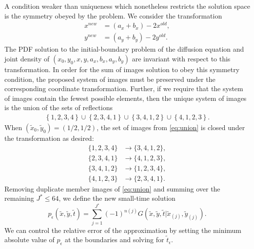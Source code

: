 A condition weaker than uniqueness which nonetheless restricts the
solution space is the symmetry obeyed by the problem. We consider the transformation
\begin{align*}
  x^{new} &= (a_x + b_x) - 2x^{old}, \\
  y^{new} &= (a_y + b_y) - 2y^{old}.            
\end{align*}
The PDF solution to the initial-boundary problem of the diffusion
equation and joint density of $(x_0,y_0,x,y,a_x,b_x,a_y,b_y)$ are
invariant with respect to this transformation. In order for the sum of
images solution to obey this symmetry condition, the proposed system
of images must be preserved under the corresponding coordinate
transformation. Further, if we require that the system of images
contain the fewest possible elements, then the unique system of images
is the union of the sets of reflections
\begin{align}
  \left\{ 1,2,3,4 \right\} \cup \left\{ 2,3,4,1 \right\} \cup \left\{ 3,4,1,2 \right\} \cup \left\{ 4,1,2,3 \right\}. \label{eq:union}
\end{align}
When $(\tilde{x}_0, \tilde{y}_0) = (1/2,1/2)$, the set of
images from \eqref{eq:union} is closed under the transformation as
desired:
\begin{align*}
  \{1,2,3,4 \} & \to \{3,4,1,2 \}, \\
  \{2,3,4,1 \} &\to \{4,1,2,3 \}, \\
  \{3,4,1,2 \} &\to \{1,2,3,4 \}, \\
  \{4,1,2,3 \} &\to \{2,3,4,1 \}.
\end{align*}
Removing duplicate member images of \eqref{eq:union} and summing over
the remaining $J^* \leq 64$, we define the new small-time solution
\begin{equation}
  p_\epsilon(\tilde{x}, \tilde{y}, \tilde{t}) = \sum_{j=1}^{J^*} (-1)^{n(j)}
  G(\tilde{x},\tilde{y},\tilde{t}|\tilde{x}_{(j)},\tilde{y}_{(j)}). \label{eq:small-time-sol}
\end{equation}
We can control the relative error of the approximation by setting the
minimum absolute value of $p_\epsilon$ at the boundaries and solving
for $\tilde{t}_\epsilon$.
